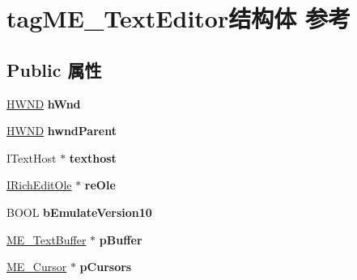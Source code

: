 \hypertarget{structtag_m_e___text_editor}{}\section{tag\+M\+E\+\_\+\+Text\+Editor结构体 参考}
\label{structtag_m_e___text_editor}
\subsection*{Public 属性}
\begin{DoxyCompactItemize}
\item 
\mbox{\label{structtag_m_e___text_editor_a54453b1e44e3178184bfa6b4f9e64bf9}} 
\hyperlink{interfacevoid}{H\+W\+ND} {\bfseries h\+Wnd}
\item 
\mbox{\label{structtag_m_e___text_editor_a41f16acd6ab611a9b78dee6e06d2fe7b}} 
\hyperlink{interfacevoid}{H\+W\+ND} {\bfseries hwnd\+Parent}
\item 
\mbox{\label{structtag_m_e___text_editor_a4c93a5ac03949c778bc9f50f963c6b34}} 
I\+Text\+Host $\ast$ {\bfseries texthost}
\item 
\mbox{\label{structtag_m_e___text_editor_a90f7c22c7d50ac33bb6e8f5d848fbf55}} 
\hyperlink{interface_i_rich_edit_ole}{I\+Rich\+Edit\+Ole} $\ast$ {\bfseries re\+Ole}
\item 
\mbox{\label{structtag_m_e___text_editor_ad5d040bbb62b2e1bc7c664e76737e30d}} 
B\+O\+OL {\bfseries b\+Emulate\+Version10}
\item 
\mbox{\label{structtag_m_e___text_editor_aabd4ab74975a975e4e02de9d63b9d684}} 
\hyperlink{structtag_m_e___text_buffer}{M\+E\+\_\+\+Text\+Buffer} $\ast$ {\bfseries p\+Buffer}
\item 
\mbox{\label{structtag_m_e___text_editor_a9e8caee89538f2bd1ae572b424945204}} 
\hyperlink{structtag_m_e___cursor}{M\+E\+\_\+\+Cursor} $\ast$ {\bfseries p\+Cursors}
\item 
\mbox{\label{structtag_m_e___text_editor_a3ac9daf2b7bc4718fc9e0c65bd45914f}} 

\end{DoxyCompactItemize}
